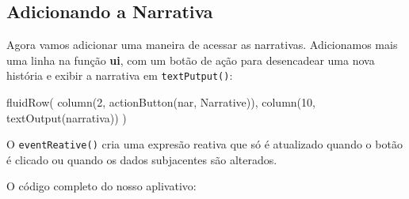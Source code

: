 \documentclass[
]{book}
\newenvironment{Shaded}{\begin{snugshade}}{\end{snugshade}}
\newcommand{\DecValTok}[1]{\textcolor[rgb]{0.00,0.00,0.81}{#1}}
\newcommand{\FunctionTok}[1]{\textcolor[rgb]{0.00,0.00,0.00}{#1}}
\newcommand{\NormalTok}[1]{#1}
\newcommand{\OtherTok}[1]{\textcolor[rgb]{0.56,0.35,0.01}{#1}}
\newcommand{\SpecialCharTok}[1]{\textcolor[rgb]{0.00,0.00,0.00}{#1}}
\newcommand{\StringTok}[1]{\textcolor[rgb]{0.31,0.60,0.02}{#1}}
\begin{document}
\hypertarget{adicionando-a-narrativa}{%
\subsection{\texorpdfstring{\textbf{Adicionando a Narrativa}}{Adicionando a Narrativa}}\label{adicionando-a-narrativa}}

Agora vamos adicionar uma maneira de acessar as narrativas. Adicionamos mais uma linha na função \textbf{ui}, com um botão de ação para desencadear uma nova história e exibir a narrativa em \texttt{textPutput()}:

\begin{Shaded}
\begin{Highlighting}[]
\FunctionTok{fluidRow}\NormalTok{(}
    \FunctionTok{column}\NormalTok{(}\DecValTok{2}\NormalTok{, }\FunctionTok{actionButton}\NormalTok{(}\StringTok{\textquotesingle{}nar\textquotesingle{}}\NormalTok{, }\StringTok{\textquotesingle{}Narrative\textquotesingle{}}\NormalTok{)),}
    \FunctionTok{column}\NormalTok{(}\DecValTok{10}\NormalTok{, }\FunctionTok{textOutput}\NormalTok{(}\StringTok{\textquotesingle{}narrativa\textquotesingle{}}\NormalTok{))}
\NormalTok{  )}
\end{Highlighting}
\end{Shaded}

O \texttt{eventReative()} cria uma expresão reativa que só é atualizado quando o botão é clicado ou quando os dados subjacentes são alterados.

\begin{Shaded}
\end{Shaded}

O código completo do nosso aplivativo:
\end{document}
